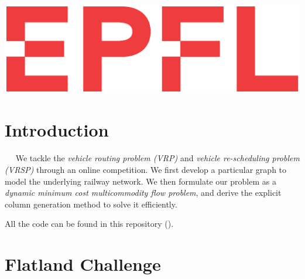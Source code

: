 \documentclass[14pt,a4paper]{article}
\theoremstyle{definition}
\numberwithin{equation}{subsection}
\begin{document}
\begin{titlepage}
\centering
 \includegraphics[width=0.5\linewidth]{img/logo.eps}\\ %

 
 

\vfill %


\end{titlepage}

\thispagestyle{empty}
\clearpage\null



\newpage
\pagestyle{fancy}
\fancyhead[L]{}




\tableofcontents
{}

\newpage


\thispagestyle{empty}
\clearpage\null\newpage






\section*{Introduction}
\label{sec:intro}

$\quad$ We tackle the \emph{vehicle routing problem (VRP)} and \emph{vehicle re-scheduling problem (VRSP)} through an online competition. We first develop a particular graph to model the underlying railway network. We then formulate our problem as a \emph{dynamic minimum cost multicommodity flow problem}, and derive the explicit column generation method to solve it efficiently.

All the code can be found in this repository (\cite{GIT}).





\section{Flatland Challenge}
\todo[inline]{\blindtext \\ \blindtext}
\end{document}

